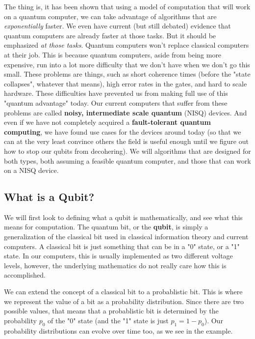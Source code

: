 The thing is, it has been shown that using a model of computation
that will work on a quantum computer,
we can take advantage of algorithms that are \textit{exponentially} faster.
We even have current (but still debated) evidence that quantum computers
are already faster at those tasks.
But it should be emphasized \textit{at those tasks}.
Quantum computers won't replace classical computers at their job.
This is because quantum computers,
aside from being more expensive,
run into a lot more difficulty that we don't have when we don't go this small.
These problems are things, 
such as short coherence times (before the "state collapses", whatever that means),
high error rates in the gates,
and hard to scale hardware.
These difficulties have prevented us from making full use of this "quantum advantage" today.
Our current computers that suffer from these problems are called
\textbf{noisy, intermediate scale quantum} (NISQ) devices.
And even if we have not completely acquired a \textbf{fault-tolerant quantum computing},
we have found use cases for the devices around today
(so that we can at the very least convince others the field is useful enough
until we figure out how to stop our qubits from decohering).
We will algorithms that are designed for both types,
both assuming a feasible quantum computer,
and those that can work on a NISQ device.

\subsection{What is a Qubit?}
We will first look to defining what a qubit is mathematically,
and see what this means for computation.
The quantum bit, or the \textbf{qubit},
is simply a generalization of the classical bit
used in classical information theory and current computers.
A classical bit is just something that can be in a "0" state,
or a "1" state.
In our computers, this is usually implemented as two different voltage levels,
however, the underlying mathematics do not really care how this is accomplished.

We can extend the concept of a classical bit to a probablistic bit.
This is where we represent the value of a bit as a probability distribution.
Since there are two possible values,
that means that a probablistic bit is determined by the probability $p_0$ of the "0" state
(and the "1" state is just $p_1=1-p_0$).
Our probability distributions can evolve over time too, as we see in the example.

